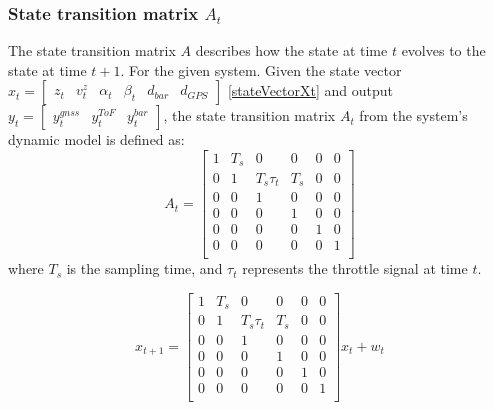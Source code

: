 \documentclass{article}
\begin{document}
    \subsubsection*{State transition matrix \( A_t \)}
    The state transition matrix \( A \) describes how the state at time \( t \) evolves to the state at time \( t+1 \). For the given system.
    Given the state vector \( x_t = \begin{bmatrix} z_t&  v_t^z&  \alpha_t&  \beta_t& d_{bar}& d_{GPS} \end{bmatrix} \) \eqref{stateVectorXt} and output \(y_t = \begin{bmatrix} y^{gnss}_t & y^{ToF}_t& y^{bar}_t \end{bmatrix} \), the state transition matrix \( A_t \) from the system's dynamic model is defined as:
    \begin{equation}
    A_t = 
    \begin{bmatrix}
    1 & T_s & 0 & 0 & 0 & 0\\
    0 & 1 & T_s \tau_t & T_s & 0 & 0\\
    0 & 0 & 1 & 0 & 0 & 0 \\
    0 & 0 & 0 & 1 & 0 & 0 \\
    0 & 0 & 0 & 0 & 1 & 0 \\
    0 & 0 & 0 & 0 & 0 & 1 \\
    \end{bmatrix}
    \end{equation}
    where \( T_s \) is the sampling time, and \( \tau_t \) represents the throttle signal at time \( t \).

    \begin{equation}
      x_{t+1} = 
      \begin{bmatrix}
        1 & T_s & 0 & 0 & 0 & 0\\
        0 & 1 & T_s \tau_t & T_s & 0 & 0\\
        0 & 0 & 1 & 0 & 0 & 0 \\
        0 & 0 & 0 & 1 & 0 & 0 \\
        0 & 0 & 0 & 0 & 1 & 0 \\
        0 & 0 & 0 & 0 & 0 & 1 \\
      \end{bmatrix}
      x_t + w_t
    \end{equation}
\end{document}
